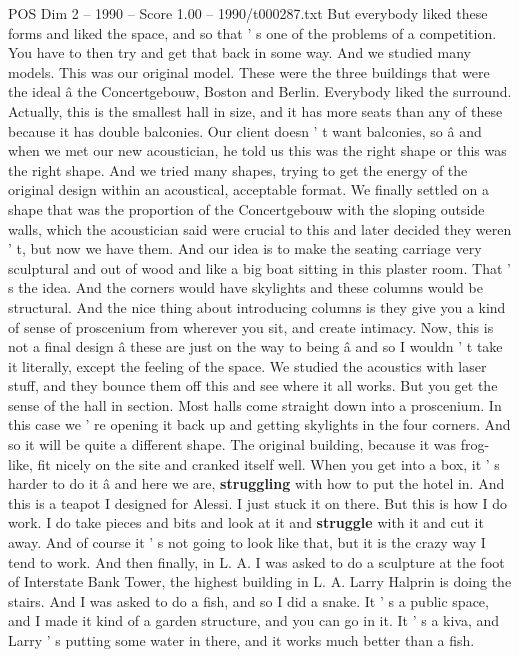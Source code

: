 \begin{textsample}{POS Dim 2 – 1990 – Score 1.00 – 1990/t000287.txt}
But everybody liked these forms and liked the space, and so that ' s one of the problems of a competition.
You have to then try and get that back in some way.
And we studied many models.
This was our original model.
These were the three buildings that were the ideal â the Concertgebouw, Boston and Berlin.
Everybody liked the surround.
Actually, this is the smallest hall in size, and it has more seats than any of these because it has double balconies.
Our client doesn ' t want balconies, so â and when we met our new acoustician, he told us this was the right shape or this was the right shape.
And we tried many shapes, trying to get the energy of the original design within an acoustical, acceptable format.
We finally settled on a shape that was the proportion of the Concertgebouw with the sloping outside walls, which the acoustician said were crucial to this and later decided they weren ' t, but now we have them.
And our idea is to make the seating carriage very sculptural and out of wood and like a big boat sitting in this plaster room.
That ' s the idea.
And the corners would have skylights and these columns would be structural.
And the nice thing about introducing columns is they give you a kind of sense of proscenium from wherever you sit, and create intimacy.
Now, this is not a final design â these are just on the way to being â and so I wouldn ' t take it literally, except the feeling of the space.
We studied the acoustics with laser stuff, and they bounce them off this and see where it all works.
But you get the sense of the hall in section.
Most halls come straight down into a proscenium.
In this case we ' re opening it back up and getting skylights in the four corners.
And so it will be quite a different shape.
The original building, because it was frog-like, fit nicely on the site and cranked itself well.
When you get into a box, it ' s harder to do it â and here we are, \textbf{struggling} with how to put the hotel in.
And this is a teapot I designed for Alessi.
I just stuck it on there.
But this is how I do work.
I do take pieces and bits and look at it and \textbf{struggle} with it and cut it away.
And of course it ' s not going to look like that, but it is the crazy way I tend to work.
And then finally, in L.
A.
I was asked to do a sculpture at the foot of Interstate Bank Tower, the highest building in L.
A.
Larry Halprin is doing the stairs.
And I was asked to do a fish, and so I did a snake.
It ' s a public space, and I made it kind of a garden structure, and you can go in it.
It ' s a kiva, and Larry ' s putting some water in there, and it works much better than a fish.

\end{textsample}
